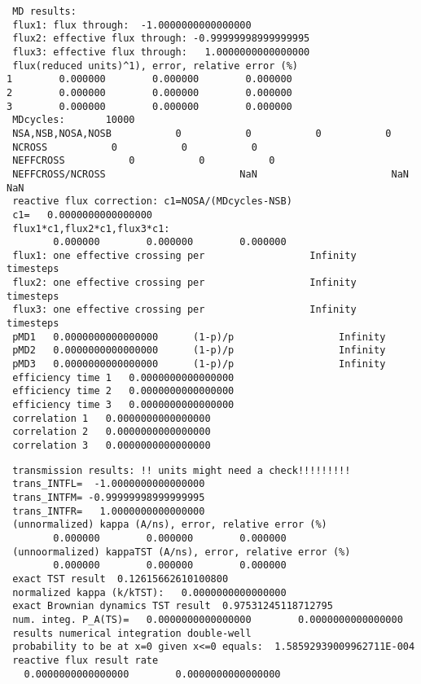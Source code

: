  \begin{verbatim}
 MD results:
 flux1: flux through:  -1.0000000000000000     
 flux2: effective flux through: -0.99999998999999995     
 flux3: effective flux through:   1.0000000000000000     
 flux(reduced units)^1), error, relative error (%)
1        0.000000        0.000000        0.000000
2        0.000000        0.000000        0.000000
3        0.000000        0.000000        0.000000
 MDcycles:       10000
 NSA,NSB,NOSA,NOSB           0           0           0           0
 NCROSS           0           0           0
 NEFFCROSS           0           0           0
 NEFFCROSS/NCROSS                       NaN                       NaN                       NaN
 reactive flux correction: c1=NOSA/(MDcycles-NSB)
 c1=   0.0000000000000000     
 flux1*c1,flux2*c1,flux3*c1:
        0.000000        0.000000        0.000000
 flux1: one effective crossing per                  Infinity  timesteps
 flux2: one effective crossing per                  Infinity  timesteps
 flux3: one effective crossing per                  Infinity  timesteps
 pMD1   0.0000000000000000      (1-p)/p                  Infinity
 pMD2   0.0000000000000000      (1-p)/p                  Infinity
 pMD3   0.0000000000000000      (1-p)/p                  Infinity
 efficiency time 1   0.0000000000000000     
 efficiency time 2   0.0000000000000000     
 efficiency time 3   0.0000000000000000     
 correlation 1   0.0000000000000000     
 correlation 2   0.0000000000000000     
 correlation 3   0.0000000000000000     
 \end{verbatim}
 \clearpage
 \begin{verbatim}
 transmission results: !! units might need a check!!!!!!!!!
 trans_INTFL=  -1.0000000000000000     
 trans_INTFM= -0.99999998999999995     
 trans_INTFR=   1.0000000000000000     
 (unnormalized) kappa (A/ns), error, relative error (%)
        0.000000        0.000000        0.000000
 (unnoormalized) kappaTST (A/ns), error, relative error (%)
        0.000000        0.000000        0.000000
 exact TST result  0.12615662610100800     
 normalized kappa (k/kTST):   0.0000000000000000     
 exact Brownian dynamics TST result  0.97531245118712795     
 num. integ. P_A(TS)=   0.0000000000000000        0.0000000000000000     
 results numerical integration double-well
 probability to be at x=0 given x<=0 equals:  1.58592939009962711E-004
 reactive flux result rate
   0.0000000000000000        0.0000000000000000     
 \end{verbatim}
 \clearpage
 \begin{verbatim}
 \end{verbatim}
